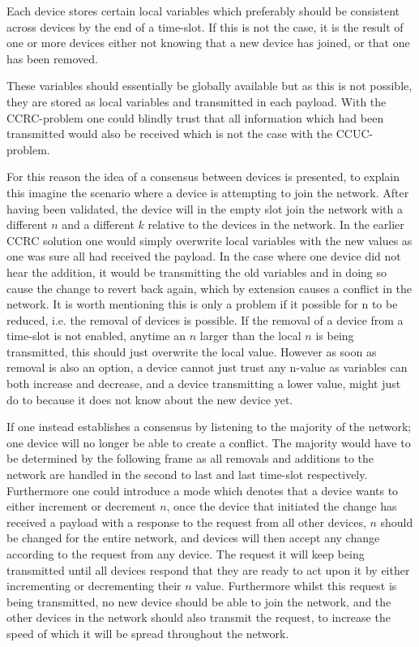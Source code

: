 Each device stores certain local variables which preferably should be consistent across devices by the end of a time-slot.
If this is not the case, it is the result of one or more devices either not knowing that a new device has joined, or that one has been removed.

These variables should essentially be globally available but as this is not possible, they are stored as local variables and transmitted in each payload.
With the CCRC-problem one could blindly trust that all information which had been transmitted would also be received which is not the case with the CCUC-problem.

\bigskip \noindent
For this reason the idea of a consensus between devices is presented, to explain this imagine the scenario where a device is attempting to join the network.
After having been validated, the device will in the empty slot join the network with a different $n$ and a different $k$ relative to the devices in the network.
In the earlier CCRC solution one would simply overwrite local variables with the new values as one was sure all had received the payload.
In the case where one device did not hear the addition, it would be transmitting the old variables and in doing so cause the change to revert back again, which by extension causes a conflict in the network.
It is worth mentioning this is only a problem if it possible for n to be reduced, i.e. the removal of devices is possible.
If the removal of a device from a time-slot is not enabled, anytime an $n$ larger than the local $n$ is being transmitted, this should just overwrite the local value. 
However as soon as removal is also an option, a device cannot just trust any n-value as variables can both increase and decrease, and a device transmitting a lower value, might just do to because it does not know about the new device yet.

If one instead establishes a consensus by listening to the majority of the network; one device will no longer be able to create a conflict.
The majority would have to be determined by the following frame as all removals and additions to the network are handled in the second to last and last time-slot respectively.
Furthermore one could introduce a mode which denotes that a device wants to either increment or decrement $n$, once the device that initiated the change has received a payload with a response to the request from all other devices, $n$ should be changed for the entire network, and devices will then accept any change according to the request from any device.
The request it will keep being transmitted until all devices respond that they are ready to act upon it by either incrementing or decrementing their $n$ value.
Furthermore whilst this request is being transmitted, no new device should be able to join the network, and the other devices in the network should also transmit the request, to increase the speed of which it will be spread throughout the network.